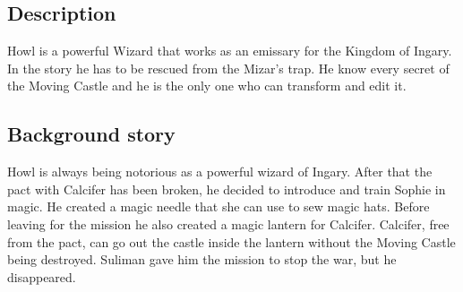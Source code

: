 \subsection{Description}
Howl is a powerful Wizard that works as an emissary for the Kingdom of Ingary. In the story he has to be rescued from the Mizar’s trap. He know every secret of the Moving Castle and he is the only one who can transform and edit it.

\subsection{Background story}
Howl is always being notorious as a powerful wizard of Ingary. After that the pact with Calcifer has been broken, he decided to introduce and train Sophie in magic. He created a magic needle that she can use to sew magic hats. Before leaving for the mission he also created a magic lantern for Calcifer. Calcifer, free from the pact, can go out the castle inside the lantern without the Moving Castle being destroyed. Suliman gave him the mission to stop the war, but he disappeared.



